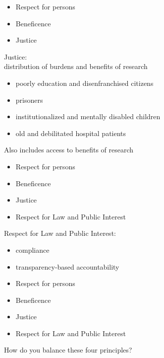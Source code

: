 \documentclass{beamer}
\begin{document}
\begin{frame}

\begin{itemize}
\item Respect for persons
\item Beneficence
\item Justice
\end{itemize}

\end{frame}
\begin{frame}

Justice:\\
distribution of burdens and benefits of research
\pause
\begin{itemize}
\item poorly education and disenfranchised citizens
\item prisoners
\item institutionalized and mentally disabled children
\item old and debilitated hospital patients
\end{itemize}
\pause
Also includes access to benefits of research

\end{frame}
\begin{frame}

\begin{itemize}
\item Respect for persons
\item Beneficence
\item Justice
\item Respect for Law and Public Interest
\end{itemize}

\end{frame}
\begin{frame}

Respect for Law and Public Interest:\\
\begin{itemize}
\item compliance
\item transparency-based accountability
\end{itemize}

\end{frame}
\begin{frame}

\begin{itemize}
\item Respect for persons
\item Beneficence
\item Justice
\item Respect for Law and Public Interest
\end{itemize}

\vfill
How do you balance these four principles?

\end{frame}
\end{document}

